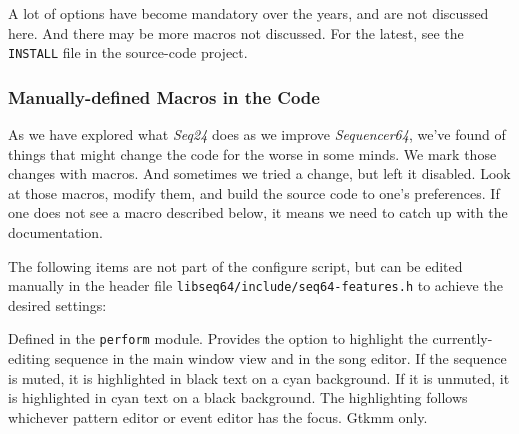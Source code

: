    A lot of options have become mandatory over the years, and are not discussed
   here.  And there may be more macros not discussed.  For the latest, see the
   \texttt{INSTALL} file in the source-code project.

\subsubsection{Manually-defined Macros in the Code}
\label{subsubsec:seq64_build_macros}

   As we have explored what \textsl{Seq24} does as we improve
   \textsl{Sequencer64}, we've found of things that might change the code
   for the worse in some minds.
   We mark those changes with macros.
   And sometimes we tried a change, but left it
   disabled.  Look at those macros, modify them, and build
   the source code to one's preferences.  If one does not see a macro described
   below, it means we need to catch up with the documentation.

   The following items are not part of the configure script, but can
   be edited manually in the header file
   \texttt{libseq64/include/seq64-features.h}
   to achieve the desired settings:

   \setcounter{ItemCounter}{0}      %
   
        Defined in the \texttt{perform} module.
        Provides the option to highlight the currently-editing sequence in the
        main window view and in the song editor.  If the sequence is muted, it
        is highlighted in black text on a cyan background.  If it is unmuted,
        it is highlighted in cyan text on a black background.  The highlighting
        follows whichever pattern editor or event editor has the focus.
        Gtkmm only.

%

